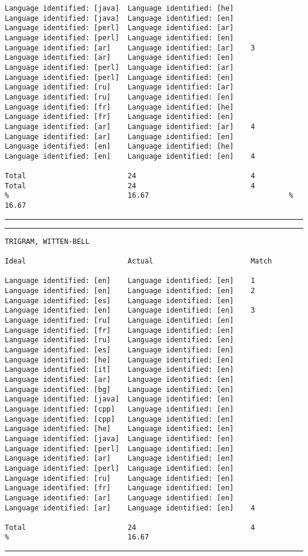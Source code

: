 \begin{verbatim}
Language identified: [java]  Language identified: [he]             Language identified: [java]  Language identified: [en]
Language identified: [perl]  Language identified: [ar]             Language identified: [perl]  Language identified: [en]
Language identified: [ar]    Language identified: [ar]    3        Language identified: [ar]    Language identified: [en]
Language identified: [perl]  Language identified: [ar]             Language identified: [perl]  Language identified: [en]
Language identified: [ru]    Language identified: [ar]             Language identified: [ru]    Language identified: [en]
Language identified: [fr]    Language identified: [he]             Language identified: [fr]    Language identified: [en]
Language identified: [ar]    Language identified: [ar]    4        Language identified: [ar]    Language identified: [en]
Language identified: [en]    Language identified: [he]             Language identified: [en]    Language identified: [en]    4

Total                        24                           4        Total                        24                           4
%                            16.67                                 %                            16.67
\end{verbatim}
\vskip4pt\hrule

\clearpage

\tiny
\hrule\vskip4pt
\begin{verbatim}
TRIGRAM, WITTEN-BELL

Ideal                        Actual                       Match

Language identified: [en]    Language identified: [en]    1
Language identified: [en]    Language identified: [en]    2
Language identified: [es]    Language identified: [en]
Language identified: [en]    Language identified: [en]    3
Language identified: [ru]    Language identified: [en]
Language identified: [fr]    Language identified: [en]
Language identified: [ru]    Language identified: [en]
Language identified: [es]    Language identified: [en]
Language identified: [he]    Language identified: [en]
Language identified: [it]    Language identified: [en]
Language identified: [ar]    Language identified: [en]
Language identified: [bg]    Language identified: [en]
Language identified: [java]  Language identified: [en]
Language identified: [cpp]   Language identified: [en]
Language identified: [cpp]   Language identified: [en]
Language identified: [he]    Language identified: [en]
Language identified: [java]  Language identified: [en]
Language identified: [perl]  Language identified: [en]
Language identified: [ar]    Language identified: [en]
Language identified: [perl]  Language identified: [en]
Language identified: [ru]    Language identified: [en]
Language identified: [fr]    Language identified: [en]
Language identified: [ar]    Language identified: [en]
Language identified: [ar]    Language identified: [en]    4

Total                        24                           4
%                            16.67
\end{verbatim}
\vskip4pt\hrule

